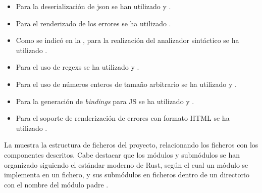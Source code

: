 \begin{itemize}
    \item Para la deserialización de \gls{json} se han utilizado 
    y .
    \item Para el renderizado de los errores se ha utilizado .
    \item Como se indicó en la , para la realización del
    analizador sintáctico se ha utilizado .
    \item Para el uso de \glspl{regex} se ha utilizado  y
    .
    \item Para el uso de números enteros de tamaño arbitrario se ha utilizado
     y .
    \item Para la generación de \textit{\glspl{binding}} para \gls{JS} se ha
    utilizado  y .
    \item Para el soporte de renderización de errores con formato HTML se ha
    utilizado .
\end{itemize}

La  muestra la estructura de ficheros del proyecto,
relacionando los ficheros con los componentes descritos. Cabe destacar que los
módulos y submódulos se han organizado siguiendo el estándar moderno de Rust,
según el cual un módulo se implementa en un fichero, y sus submódulos en ficheros
dentro de un directorio con el nombre del módulo padre \parencite{Rust}.

\newcommand{\componentref}[1]{\hyperref[req:#1]{#1}}

